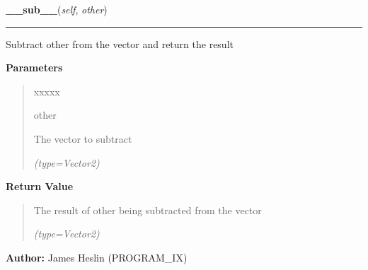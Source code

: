 \hspace{.8\funcindent}\begin{boxedminipage}{\funcwidth}

    \raggedright \textbf{\_\_sub\_\_}(\textit{self}, \textit{other})

    \vspace{-1.5ex}

    \rule{\textwidth}{0.5\fboxrule}
\setlength{\parskip}{2ex}
    Subtract other from the vector and return the result

\setlength{\parskip}{1ex}
      \textbf{Parameters}
      \vspace{-1ex}

      \begin{quote}
        \begin{Ventry}{xxxxx}

          \item[other]

          The vector to subtract

            {\it (type=Vector2)}

        \end{Ventry}

      \end{quote}

      \textbf{Return Value}
    \vspace{-1ex}

      \begin{quote}
      The result of other being subtracted from the vector

      {\it (type=Vector2)}

      \end{quote}

\textbf{Author:} James Heslin (PROGRAM\_IX)



    \end{boxedminipage}

    \label{pystroke:vector2:Vector2:__neg__}

    \vspace{0.5ex}

